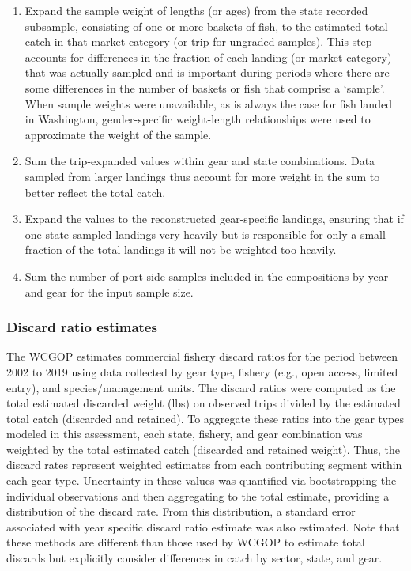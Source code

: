 \documentclass[11pt,
  english,
  a4paper,
]{article}
\begin{document}
\begin{enumerate}
\item Expand the sample weight of lengths (or ages) from the state recorded subsample, consisting of one or more baskets of fish, to the estimated total catch in that market category (or trip for ungraded samples). This step accounts for differences in the fraction of each landing (or market category) that was actually sampled and is important during periods where there are some differences in the number of baskets or fish that comprise a `sample'. When sample weights were unavailable, as is always the case for fish landed in Washington, gender-specific weight-length relationships were used to approximate the weight of the sample. 
\item Sum the trip-expanded values within gear and state combinations. Data sampled from larger landings thus account for more weight in the sum to better reflect the total catch.
\item Expand the values to the reconstructed gear-specific landings, ensuring that if one state sampled landings very heavily but is responsible for only a small fraction of the total landings it will not be weighted too heavily.
\item Sum the number of port-side samples included in the compositions by year and gear for the input sample size.
\end{enumerate}


\hypertarget{discard-ratio-estimates}{%
\subsubsection{Discard ratio estimates}\label{discard-ratio-estimates}}

\leavevmode\tagmcend\tagstructend


The WCGOP estimates commercial fishery discard ratios for the period between 2002 to 2019 using data collected by gear type, fishery (e.g., open access, limited entry), and species/management units. The discard ratios were computed as the total estimated discarded weight (lbs) on observed trips divided by the estimated total catch (discarded and retained). To aggregate these ratios into the gear types modeled in this assessment, each state, fishery, and gear combination was weighted by the total estimated catch (discarded and retained weight). Thus, the discard rates represent weighted estimates from each contributing segment within each gear type. Uncertainty in these values was quantified via bootstrapping the individual observations and then aggregating to the total estimate, providing a distribution of the discard rate. From this distribution, a standard error associated with year specific discard ratio estimate was also estimated. Note that these methods are different than those used by WCGOP to estimate total discards but explicitly consider differences in catch by sector, state, and gear.
\end{document}
